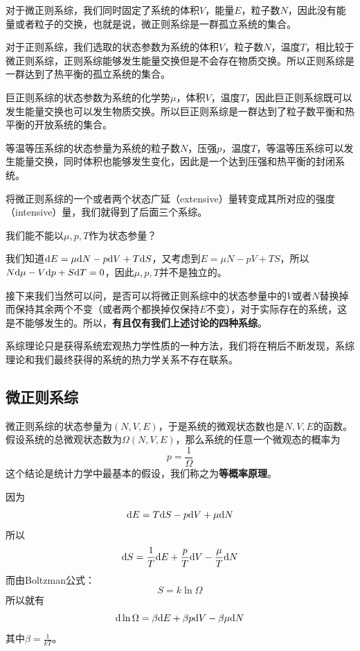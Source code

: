 对于微正则系综，我们同时固定了系统的体积$V$，能量$E$，粒子数$N$，因此没有能量或者粒子的交换，也就是说，微正则系综是一群孤立系统的集合。

对于正则系综，我们选取的状态参数为系统的体积$V$，粒子数$N$，温度$T$，相比较于微正则系综，正则系综能够发生能量交换但是不会存在物质交换。所以正则系综是一群达到了热平衡的孤立系统的集合。

巨正则系综的状态参数为系统的化学势$\mu$，体积$V$，温度$T$，因此巨正则系综既可以发生能量交换也可以发生物质交换。所以巨正则系综是一群达到了粒子数平衡和热平衡的开放系统的集合。

等温等压系综的状态参量为系统的粒子数$N$，压强$p$，温度$T$，等温等压系综可以发生能量交换，同时体积也能够发生变化，因此是一个达到压强和热平衡的封闭系统。

将微正则系综的一个或者两个状态广延（extensive）量转变成其所对应的强度（intensive）量，我们就得到了后面三个系综。

\begin{example}
       我们能不能以$\mu,p,T$作为状态参量？
\end{example}
\begin{solution}
       我们知道$\mathrm{d} E= \mu \mathrm{d} N -p \mathrm{d} V +T\mathrm{d} S$，又考虑到$E=\mu N -pV+TS$，所以$N\mathrm{d} \mu -V\mathrm{d} p +S\mathrm{d} T=0$，因此$\mu,p,T$并不是独立的。
\end{solution}

接下来我们当然可以问，是否可以将微正则系综中的状态参量中的$V$或者$N$替换掉而保持其余两个不变（或者两个都换掉仅保持$E$不变），对于实际存在的系统，这是不能够发生的。所以，\textbf{有且仅有我们上述讨论的四种系综}。

系综理论只是获得系统宏观热力学性质的一种方法，我们将在稍后不断发现，系综理论和我们最终获得的系统的热力学关系不存在联系。
\subsection{微正则系综} %
\label{sub:微正则系综}

微正则系综的状态参量为$(N,V,E)$，于是系统的微观状态数也是$N,V,E$的函数。假设系统的总微观状态数为$\Omega(N,V,E)$，那么系统的任意一个微观态的概率为\begin{equation}
       p=\frac{1}{\Omega}
\end{equation}
这个结论是统计力学中最基本的假设，我们称之为\textbf{等概率原理}。

因为\begin{equation}
       \mathrm{d} E= T\mathrm{d} S-p\mathrm{d} V +\mu \mathrm{d} N
\end{equation}
所以\begin{equation}
       \mathrm{d} S =\frac{1}{T} \mathrm{d} E + \frac{p}{T}\mathrm{d} V -\frac{\mu}{T}\mathrm{d} N
\end{equation}
而由Boltzman公式：
\begin{equation}
       S=k\ln \Omega
\end{equation}
所以就有\begin{equation}
       \mathrm{d} \ln \Omega =\beta \mathrm{d} E +\beta p\mathrm{d} V -\beta \mu \mathrm{d} N
\end{equation}
其中$\displaystyle \beta=\frac{1}{k T}$。

